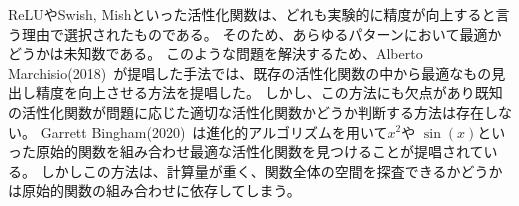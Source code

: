 ReLUやSwish, Mishといった活性化関数は、どれも実験的に精度が向上すると言う理由で選択されたものである。
そのため、あらゆるパターンにおいて最適かどうかは未知数である。
このような問題を解決するため、Alberto Marchisio(2018)~\cite{automatic_af}が提唱した手法では、既存の活性化関数の中から最適なもの見出し精度を向上させる方法を提唱した。
しかし、この方法にも欠点があり既知の活性化関数が問題に応じた適切な活性化関数かどうか判断する方法は存在しない。
Garrett Bingham(2020)~\cite{evo_af}は進化的アルゴリズムを用いて$ x^2 $や $ \sin (x) $といった原始的関数を組み合わせ最適な活性化関数を見つけることが提唱されている。
しかしこの方法は、計算量が重く、関数全体の空間を探査できるかどうかは原始的関数の組み合わせに依存してしまう。




